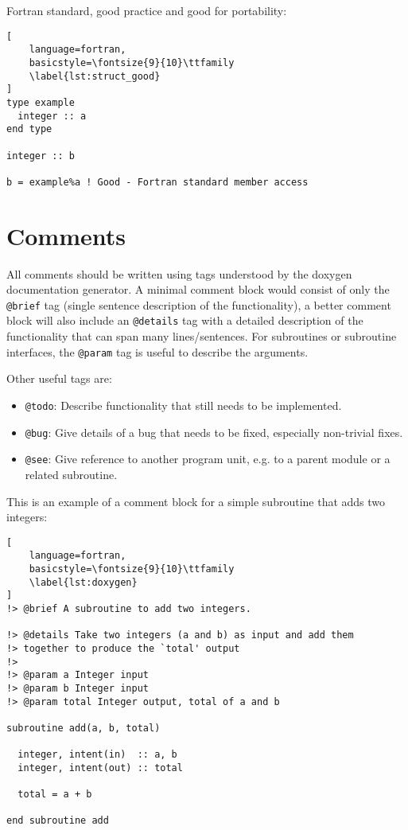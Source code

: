 \documentclass[11pt]{article}
\begin{document}
Fortran standard, good practice and good for portability:
\begin{lstlisting}[
	language=fortran,
    basicstyle=\fontsize{9}{10}\ttfamily
    \label{lst:struct_good}
]
type example
  integer :: a
end type

integer :: b

b = example%a ! Good - Fortran standard member access
\end{lstlisting}

\section{Comments}
All comments should be written using tags understood by the doxygen documentation generator. A minimal comment
block would consist of only the \texttt{@brief} tag (single sentence description of the functionality), a better comment
block will also include an \texttt{@details} tag with a detailed description of the functionality that can span many 
lines/sentences. For subroutines or subroutine interfaces, the \texttt{@param} tag is useful to describe the arguments.

Other useful tags are:
\begin{itemize}
  \item \texttt{@todo}: Describe functionality that still needs to be implemented.
  \item \texttt{@bug}: Give details of a bug that needs to be fixed, especially non-trivial fixes.
  \item \texttt{@see}: Give reference to another program unit, e.g. to a parent module or a related subroutine.
\end{itemize}


This is an example of a comment block for a simple subroutine that adds two integers:

\begin{lstlisting}[
	language=fortran,
    basicstyle=\fontsize{9}{10}\ttfamily
    \label{lst:doxygen}
]
!> @brief A subroutine to add two integers.

!> @details Take two integers (a and b) as input and add them
!> together to produce the `total' output
!> 
!> @param a Integer input
!> @param b Integer input
!> @param total Integer output, total of a and b

subroutine add(a, b, total)

  integer, intent(in)  :: a, b
  integer, intent(out) :: total

  total = a + b

end subroutine add
\end{lstlisting}
\end{document}
